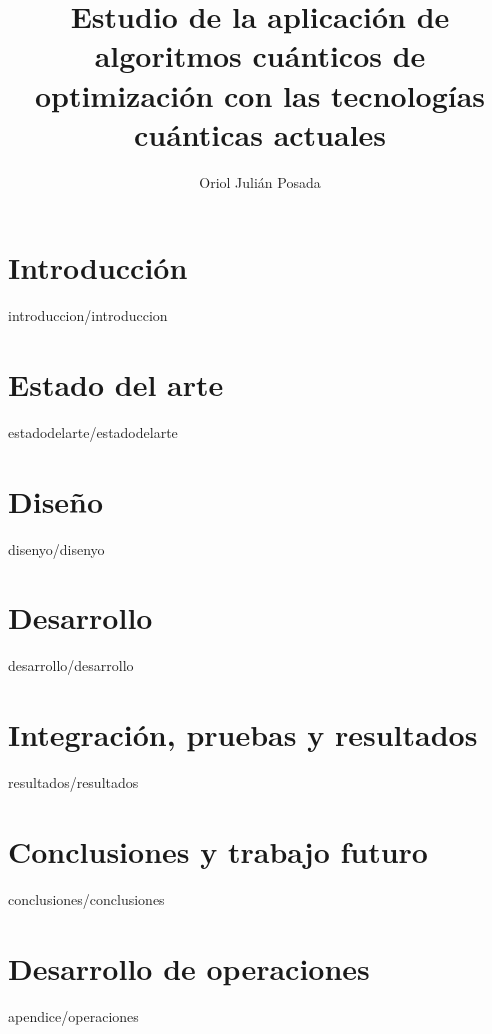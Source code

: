 \documentclass[epsbased,copyright,final,printable,covers,extendedindex,firstnumbered,tfg,gnuplot]{tfgtfmthesisuam}
\title{Estudio de la aplicación de algoritmos cuánticos de optimización con las tecnologías cuánticas actuales}
\author{Oriol Julián Posada}
\begin{document}
\chapter{Introducción\label{cap:introduccion}}{introduccion/introduccion}

\chapter{Estado del arte\label{CAP:ESTADODELARTE}}{estadodelarte/estadodelarte}

\chapter{Diseño\label{CAP:DISEÑO}}{disenyo/disenyo}

\chapter{Desarrollo\label{CAP:DESARROLLO}}{desarrollo/desarrollo}

\chapter{Integración, pruebas y resultados\label{CAP:RESULTADOS}}{resultados/resultados}

\chapter{Conclusiones y trabajo futuro\label{CAP:CONCLUSIONES}}{conclusiones/conclusiones}



\newpage
{}




\appendix

\chapter{Desarrollo de operaciones}{apendice/operaciones}  %
\end{document}
